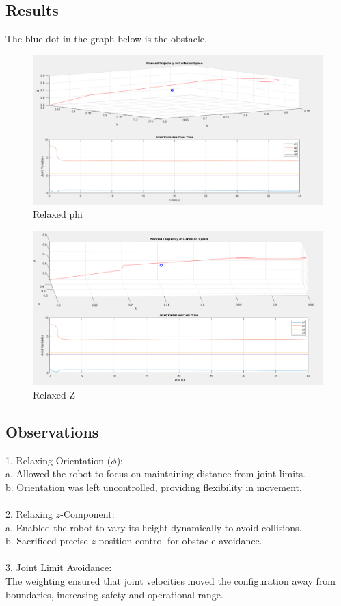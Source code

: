 \documentclass[12pt]{report}
\begin{document}
\subsection{Results}
The blue dot in the graph below is the obstacle.
\begin{figure}[H]
	\hspace{-15mm}
	\includegraphics[scale=0.56]{R8} %
	\caption{Relaxed phi}
	\label{run10} %
\end{figure}
\begin{figure}[H]
	\hspace{-15mm}
	\includegraphics[scale=0.56]{R9} %
	\caption{Relaxed Z}
	\label{run10} %
\end{figure}
\subsection{Observations}
1. Relaxing Orientation (\(\phi\)):\\a. Allowed the robot to focus on maintaining distance from joint limits.\\b. Orientation was left uncontrolled, providing flexibility in movement.\\\\2. Relaxing \(z\)-Component:\\a. Enabled the robot to vary its height dynamically to avoid collisions.\\b. Sacrificed precise \(z\)-position control for obstacle avoidance.\\\\3. Joint Limit Avoidance:\\The weighting ensured that joint velocities moved the configuration away from boundaries, increasing safety and operational range.
\end{document}
